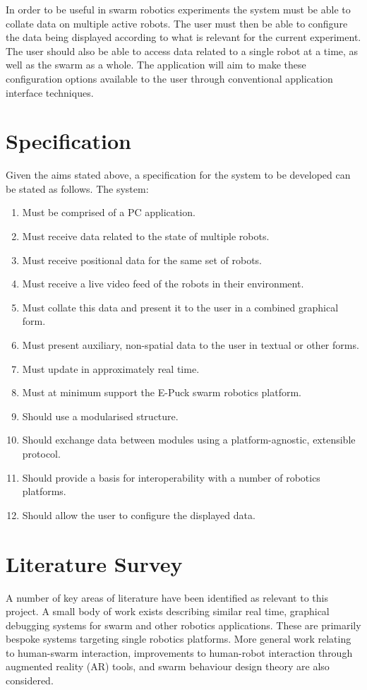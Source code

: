 \documentclass[titlepage,hidelinks,10pt]{article}
\begin{document}
\begin{multicols*}{2}

In order to be useful in swarm robotics experiments the system must be able to collate data on multiple active robots. The user must then be able to configure the data being displayed according to what is relevant for the current experiment. The user should also be able to access data related to a single robot at a time, as well as the swarm as a whole. The application will aim to make these configuration options available to the user through conventional application interface techniques.

\section{Specification}
Given the aims stated above, a specification for the system to be developed can be stated as follows. The system:

\begin{enumerate}
	\item Must be comprised of a PC application.
	\item Must receive data related to the state of multiple robots.
	\item Must receive positional data for the same set of robots.
	\item Must receive a live video feed of the robots in their environment.
	\item Must collate this data and present it to the user in a combined graphical form.
	\item Must present auxiliary, non-spatial data to the user in textual or other forms.
	\item Must update in approximately real time.
	\item Must at minimum support the E-Puck swarm robotics platform.
	\item Should use a modularised structure.
	\item Should exchange data between modules using a platform-agnostic, extensible protocol.
	\item Should provide a basis for interoperability with a number of robotics platforms.
	\item Should allow the user to configure the displayed data.
\end{enumerate}

\section{Literature Survey}
A number of key areas of literature have been identified as relevant to this project. A small body of work exists describing similar real time, graphical debugging systems for swarm and other robotics applications. These are primarily bespoke systems targeting single robotics platforms. More general work relating to human-swarm interaction, improvements to human-robot interaction through augmented reality (AR) tools, and swarm behaviour design theory are also considered.


\end{multicols*}
\end{document}
